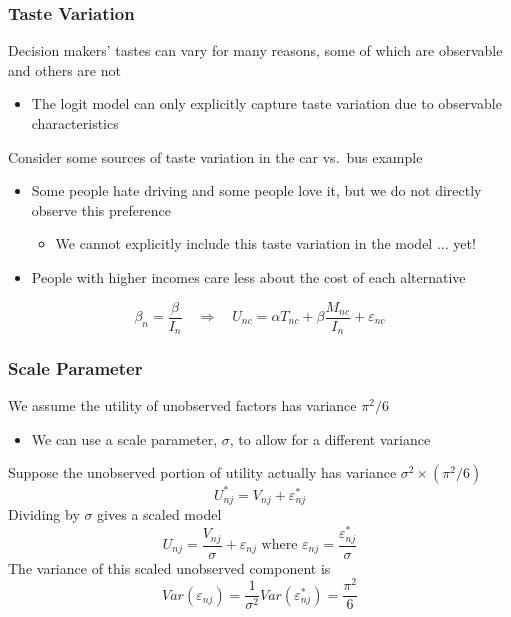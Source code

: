 \documentclass{beamer}\usepackage[]{graphicx}\usepackage[]{color}
\begin{document}
\begin{frame}\frametitle{Taste Variation}
    Decision makers' tastes can vary for many reasons, some of which are observable and others are not
    \begin{itemize}
    	\item The logit model can only explicitly capture taste variation due to observable characteristics 
    \end{itemize}
    \vspace{2ex}
    Consider some sources of taste variation in the car vs.\ bus example
    \begin{itemize}
    	\item Some people hate driving and some people love it, but we do not directly observe this preference
    	\begin{itemize}
    		\item We cannot explicitly include this taste variation in the model $\ldots$ yet!
    	\end{itemize}
    	\item People with higher incomes care less about the cost of each alternative
    \end{itemize}
    $$\beta_n = \frac{\beta}{I_n} \quad \Rightarrow \quad U_{nc} = \alpha T_{nc} + \beta \frac{M_{nc}}{I_n} + \varepsilon_{nc}$$
\end{frame}

\begin{frame}\frametitle{Scale Parameter}
    We assume the utility of unobserved factors has variance $\pi^2 / 6$
    \begin{itemize}
    	\item We can use a scale parameter, $\sigma$, to allow for a different variance \\
    \end{itemize}
    \vspace{2ex}
    Suppose the unobserved portion of utility actually has variance $\sigma^2 \times (\pi^2 / 6)$
    $$U_{nj}^* = V_{nj} + \varepsilon_{nj}^*$$
    Dividing by $\sigma$ gives a scaled model
    $$U_{nj} = \frac{V_{nj}}{\sigma} + \varepsilon_{nj} \text{ where } \varepsilon_{nj} = \frac{\varepsilon_{nj}^*}{\sigma}$$
    The variance of this scaled unobserved component is
    $$Var(\varepsilon_{nj}) = \frac{1}{\sigma^2} Var(\varepsilon_{nj}^*) = \frac{\pi^2}{6}$$
\end{frame}
\end{document}
